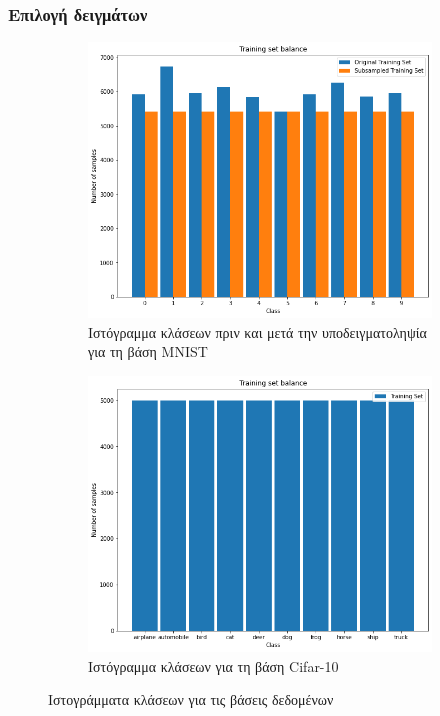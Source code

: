 \documentclass{beamer}
\begin{document}
\begin{frame}
\frametitle{Επιλογή δειγμάτων}

\begin{figure}[H]
    \centering

    \begin{subfigure}[t]{0.48\linewidth}
    \includegraphics[width=\linewidth]{figures/mnist/training_freq.png}
    \caption{Ιστόγραμμα κλάσεων πριν και μετά την υποδειγματοληψία για τη βάση
    MNIST}
    \label{fig:hist1}
    \end{subfigure}
    \begin{subfigure}[t]{0.48\linewidth}
    \includegraphics[width=\linewidth]{figures/cifar/training_freq.png}
    \caption{Ιστόγραμμα κλάσεων για τη βάση Cifar-10}
    \end{subfigure}

    \caption{Ιστογράμματα κλάσεων για τις βάσεις δεδομένων}
    \label{fig:hist}
\end{figure}

\end{frame}
\end{document}
